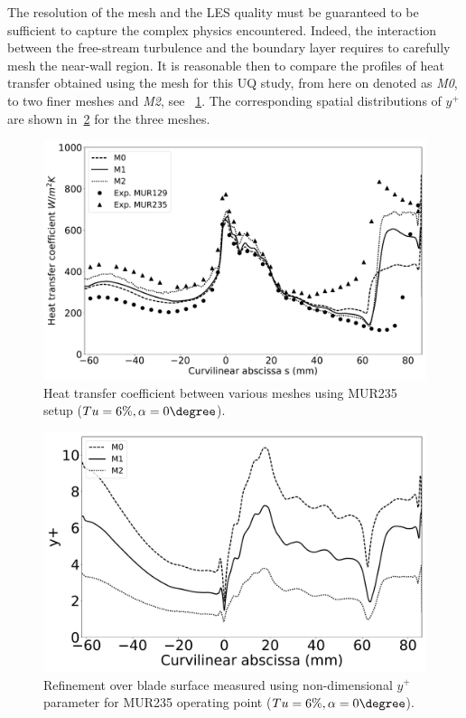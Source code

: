 The resolution of the mesh and the LES quality must be guaranteed to be sufficient to capture the complex physics encountered. Indeed, the interaction between the free-stream turbulence and the boundary layer requires to carefully mesh the near-wall region. It is reasonable then to compare the profiles of heat transfer obtained using the mesh for this UQ study, from here on denoted as \textit{M0}, to two finer meshes  and \textit{M2}, see ~\cref{fig:M0M1M2_hcomp}. The corresponding spatial distributions of ${y^+}$ are shown in~\cref{fig:M0M1M2_y+comp} for the three meshes.

\begin{figure}[!h]
\centering
\includegraphics[width=0.8\linewidth,keepaspectratio]{fig/applications/ls89/Heatflux_M0M1M2_comp.pdf}
\caption{Heat transfer coefficient between various meshes using MUR235 setup ($Tu=6\%, \alpha = 0\degree$).}
\label{fig:M0M1M2_hcomp}
\end{figure}

\begin{figure}[!h]
\centering
\includegraphics[width=0.8\linewidth,keepaspectratio]{fig/applications/ls89/yplus_M0M1M2_comp.pdf}
\caption{Refinement over blade surface measured using non-dimensional $y^+$ parameter for MUR235 operating point ($Tu=6\%, \alpha = 0\degree$).}
\label{fig:M0M1M2_y+comp}
\end{figure}

